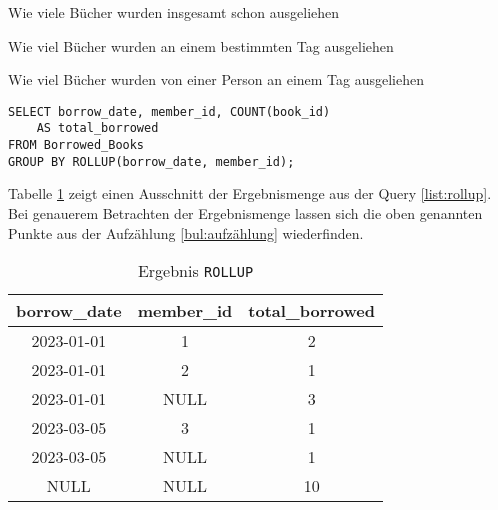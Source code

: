 \begin{description}
	\label{bul:aufzählung}

	\item[$\bullet$ 1. Punkt] Wie viele Bücher wurden insgesamt schon ausgeliehen

	\item[$\bullet$ 2. Punkt] Wie viel Bücher wurden an einem bestimmten Tag ausgeliehen

	\item[$\bullet$ 2. Punkt] Wie viel Bücher wurden von einer Person an einem Tag
		ausgeliehen
\end{description}

\begin{lstlisting}[caption={Beispiel eines ROLLUP}, label={list:rollup}]
SELECT borrow_date, member_id, COUNT(book_id)
	AS total_borrowed
FROM Borrowed_Books
GROUP BY ROLLUP(borrow_date, member_id);
\end{lstlisting}

Tabelle \ref{tab:rollup} zeigt einen Ausschnitt der Ergebnismenge aus der Query
\ref{list:rollup}. Bei genauerem Betrachten der Ergebnismenge lassen sich die oben
genannten Punkte aus der Aufzählung \ref{bul:aufzählung} wiederfinden.

\begin{table}[h]
	\centering
	\begin{tabular}{|c|c|c|}
		\hline
		\textbf{borrow\_date} & \textbf{member\_id} & \textbf{total\_borrowed} \\
		\hline
		2023-01-01            & 1                   & 2                        \\ %
		\hline
		2023-01-01            & 2                   & 1                        \\ %
		\hline
		2023-01-01            & NULL                & 3                        \\ %
		\hline
		2023-03-05            & 3                   & 1                        \\
		\hline
		2023-03-05            & NULL                & 1                        \\
		\hline
		NULL                  & NULL                & 10                       \\
		\hline
	\end{tabular}
	\caption{Ergebnis \texttt{ROLLUP}}
	\label{tab:rollup}
\end{table}

